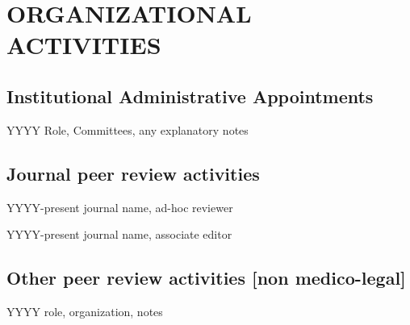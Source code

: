 \documentclass[11pt]{article}
\newenvironment{lyxlist}[1]
	{\begin{list}{}
		{\setlength\itemsep{-0.5ex}
		\settowidth{\labelwidth}{#1}
		 \setlength{\leftmargin}{\labelwidth}
		 \addtolength{\leftmargin}{\labelsep}
		 \renewcommand{\makelabel}[1]{##1\hfil}}}
	{\end{list}}
\begin{document}
	

\section*{ORGANIZATIONAL ACTIVITIES}
\subsection*{Institutional Administrative Appointments}
\begin{lyxlist}{0000-present}
\item[{YYYY}]Role, Committees, any explanatory notes
\end{lyxlist}

\subsection*{Journal peer review activities}

\begin{lyxlist}{JHMI/regional}
\item[{YYYY-present}]journal name, ad-hoc reviewer
\item[{YYYY-present}]journal name, associate editor
\end{lyxlist}

\subsection*{Other peer review activities [non medico-legal]}
\begin{lyxlist}{JHMI/regional}
\item[{YYYY}]role, organization, notes
\end{lyxlist}
	
\end{document}
